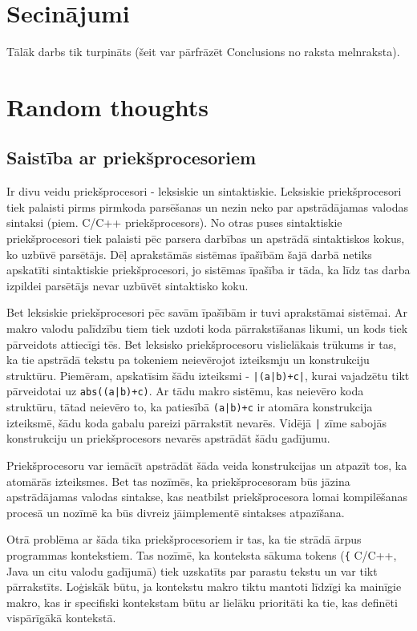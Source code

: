 \documentclass[12pt]{report}
\begin{document}
\section{Secinājumi}
Tālāk darbs tik turpināts (šeit var pārfrāzēt Conclusions no raksta melnraksta).


\section{Random thoughts}
\subsection{Saistība ar priekšprocesoriem}
Ir divu veidu priekšprocesori - leksiskie un sintaktiskie. Leksiskie priekšprocesori tiek palaisti pirms pirmkoda parsēšanas un nezin neko par apstrādājamas valodas sintaksi (piem. C/C++ priekšprocesors). No otras puses sintaktiskie priekšprocesori tiek palaisti pēc parsera darbības un apstrādā sintaktiskos kokus, ko uzbūvē parsētājs. Dēļ aprakstāmās sistēmas īpašībām šajā darbā netiks apskatīti sintaktiskie priekšprocesori, jo sistēmas īpašība ir tāda, ka līdz tas darba izpildei parsētājs nevar uzbūvēt sintaktisko koku.

Bet leksiskie priekšprocesori pēc savām īpašībām ir tuvi aprakstāmai sistēmai. Ar makro valodu palīdzību tiem tiek uzdoti koda pārrakstīšanas likumi, un kods tiek pārveidots attiecīgi tēs. Bet leksisko priekšprocesoru vislielākais trūkums ir tas, ka tie apstrādā tekstu pa tokeniem neievērojot izteiksmju un konstrukciju struktūru. Piemēram, apskatīsim šādu izteiksmi - \verb/|(a|b)+c|/, kurai vajadzētu tikt pārveidotai uz \verb/abs((a|b)+c)/. Ar tādu makro sistēmu, kas neievēro koda struktūru, tātad neievēro to, ka patiesībā \verb/(a|b)+c/ ir atomāra konstrukcija izteiksmē, šādu koda gabalu pareizi pārrakstīt nevarēs. Vidējā \verb/|/ zīme sabojās konstrukciju un priekšprocesors nevarēs apstrādāt šādu gadījumu.

Priekšprocesoru var iemācīt apstrādāt šāda veida konstrukcijas un atpazīt tos, ka atomārās izteiksmes. Bet tas nozīmēs, ka priekšprocesoram būs jāzina apstrādājamas valodas sintakse, kas neatbilst priekšprocesora lomai kompilēšanas procesā un nozīmē ka būs divreiz jāimplementē sintakses atpazīšana.

Otrā problēma ar šāda tika priekšprocesoriem ir tas, ka tie strādā ārpus programmas kontekstiem. Tas nozīmē, ka konteksta sākuma tokens (\verb|{| C/C++, Java un citu valodu gadījumā) tiek uzskatīts par parastu tekstu un var tikt pārrakstīts. Loģiskāk būtu, ja kontekstu makro tiktu mantoti līdzīgi ka mainīgie  makro, kas ir specifiski kontekstam būtu ar lielāku prioritāti ka tie, kas definēti vispārīgākā kontekstā. 
\end{document}
